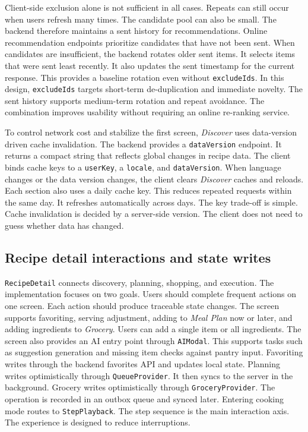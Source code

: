 \documentclass[journal]{IEEEtran}
\begin{document}
Client-side exclusion alone is not sufficient in all cases. Repeats can still occur when users refresh many times. The candidate pool can also be small. The backend therefore maintains a sent history for recommendations. Online recommendation endpoints prioritize candidates that have not been sent. When candidates are insufficient, the backend rotates older sent items. It selects items that were sent least recently. It also updates the sent timestamp for the current response. This provides a baseline rotation even without \texttt{excludeIds}. In this design, \texttt{excludeIds} targets short-term de-duplication and immediate novelty. The sent history supports medium-term rotation and repeat avoidance. The combination improves usability without requiring an online re-ranking service.

To control network cost and stabilize the first screen, \textit{Discover} uses data-version driven cache invalidation. The backend provides a \texttt{dataVersion} endpoint. It returns a compact string that reflects global changes in recipe data. The client binds cache keys to a \texttt{userKey}, a \texttt{locale}, and \texttt{dataVersion}. When language changes or the data version changes, the client clears \textit{Discover} caches and reloads. Each section also uses a daily cache key. This reduces repeated requests within the same day. It refreshes automatically across days. The key trade-off is simple. Cache invalidation is decided by a server-side version. The client does not need to guess whether data has changed.

\subsection{Recipe detail interactions and state writes}

\texttt{RecipeDetail} connects discovery, planning, shopping, and execution. The implementation focuses on two goals. Users should complete frequent actions on one screen. Each action should produce traceable state changes. The screen supports favoriting, serving adjustment, adding to \textit{Meal Plan} now or later, and adding ingredients to \textit{Grocery}. Users can add a single item or all ingredients. The screen also provides an AI entry point through \texttt{AIModal}. This supports tasks such as suggestion generation and missing item checks against pantry input. Favoriting writes through the backend favorites API and updates local state. Planning writes optimistically through \texttt{QueueProvider}. It then syncs to the server in the background. Grocery writes optimistically through \texttt{GroceryProvider}. The operation is recorded in an outbox queue and synced later. Entering cooking mode routes to \texttt{StepPlayback}. The step sequence is the main interaction axis. The experience is designed to reduce interruptions.
\end{document}
